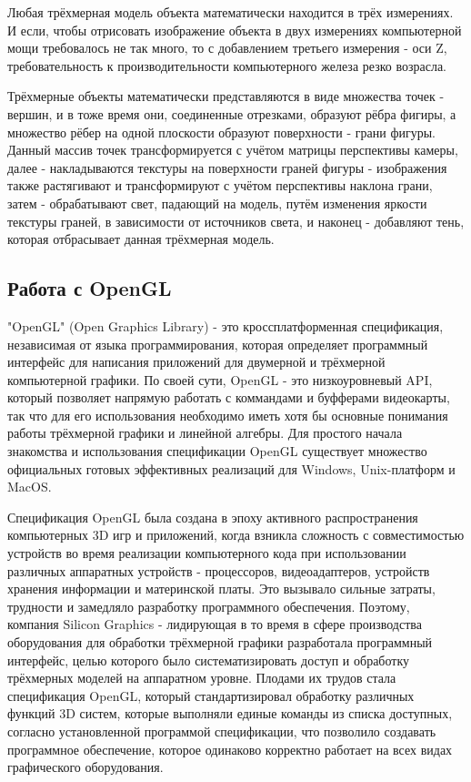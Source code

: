 Любая трёхмерная модель объекта математически находится в трёх измерениях. И если, чтобы отрисовать изображение объекта в двух измерениях компьютерной мощи требовалось не так много, то с добавлением третьего измерения - оси Z, требовательность к производительности компьютерного железа резко возрасла.

Трёхмерные объекты математически представляются в виде множества точек - вершин, и в тоже время они, соединенные отрезками, образуют рёбра фигиры, а множество рёбер на одной плоскости образуют поверхности - грани фигуры. Данный массив точек трансформируется с учётом матрицы перспективы камеры, далее - накладываются текстуры на поверхности граней фигуры - изображения также растягивают и трансформируют с учётом перспективы наклона грани, затем - обрабатывают свет, падающий на модель, путём изменения яркости текстуры граней, в зависимости от источников света, и наконец - добавляют тень, которая отбрасывает данная трёхмерная модель.

\subsection{Работа с OpenGL}

"OpenGL" (Open Graphics Library) - это кроссплатформенная спецификация, независимая от языка программирования, которая определяет программный интерфейс для написания приложений для двумерной и трёхмерной компьютерной графики. По своей сути, OpenGL - это низкоуровневый API, который позволяет напрямую работать с коммандами и буфферами видеокарты, так что для его использования необходимо иметь хотя бы основные понимания работы трёхмерной графики и линейной алгебры. Для простого начала знакомства и использования спецификации OpenGL существует множество официальных готовых эффективных реализаций для Windows, Unix-платформ и MacOS.

Спецификация OpenGL была создана в эпоху активного распространения компьютерных 3D игр и приложений, когда взникла сложность с совместимостью устройств во время реализации компьютерного кода при использовании различных аппаратных устройств - процессоров, видеоадаптеров, устройств хранения информации и материнской платы. Это вызывало сильные затраты, трудности и замедляло разработку программного обеспечения. Поэтому, компания Silicon Graphics - лидирующая в то время в сфере производства оборудования для обработки трёхмерной графики разработала программный интерфейс, целью которого было систематизировать доступ и обработку трёхмерных моделей на аппаратном уровне. Плодами их трудов стала спецификация OpenGL, который стандартизировал обработку различных функций 3D систем, которые выполняли единые команды из списка доступных, согласно установленной программой спецификации, что позволило создавать программное обеспечение, которое одинаково корректно работает на всех видах графического оборудования.

